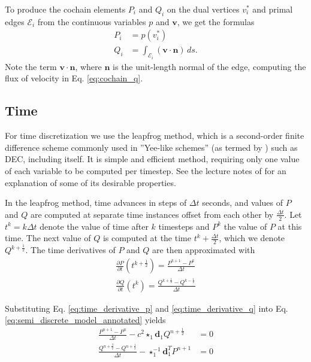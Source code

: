 \documentclass[utf8,english]{gradu3}
\begin{document}
To produce the cochain elements $P_i$ and $Q_i$
on the dual vertices $v_i^*$ and primal edges $\mathcal{E}_i$
from the continuous variables $p$ and $\mathbf{v}$,
we get the formulas
\begin{align}
  \label{eq:cochain_p}
  P_i &= p(v_i^*) \\
  \label{eq:cochain_q}
  Q_i &= \int_{\mathcal{E}_i} (\mathbf{v} \cdot \mathbf{n}) \,ds.
\end{align}
Note the term $\mathbf{v} \cdot \mathbf{n}$,
where $\mathbf{n}$ is the unit-length normal of the edge,
computing the flux of velocity in Eq. \eqref{eq:cochain_q}.


\subsection{Time}\label{sec:time_discr}

For time discretization we use the leapfrog method,
which is a second-order finite difference scheme
commonly used in ''Yee-like schemes''
(as termed by \textcite{bossavit_yee-like_1999}) such as DEC,
including \textcite{yee_numerical_1966} itself.
It is simple and efficient method,
requiring only one value of each variable to be computed per timestep.
See the lecture notes of \textcite{young_leapfrog_2014} for an explanation
of some of its desirable properties.

In the leapfrog method, time advances in steps of $\Delta t$ seconds,
and values of $P$ and $Q$ are computed at separate time instances
offset from each other by $\frac{\Delta t}{2}$.
Let $t^k = k\Delta t$ denote the value of time after $k$ timesteps
and $P^k$ the value of $P$ at this time.
The next value of $Q$ is computed at the time $t^k + \frac{\Delta t}{2}$,
which we denote $Q^{k+\frac{1}{2}}$.
The time derivatives of $P$ and $Q$ are then approximated with
\begin{eqnarray}
  \label{eq:time_derivative_p}
  \frac{\partial P}{\partial t}(t^{k+\frac{1}{2}}) = \frac{P^{k+1} - P^k}{\Delta t} \\
  \label{eq:time_derivative_q}
  \frac{\partial Q}{\partial t}(t^k) = \frac{Q^{k+\frac{1}{2}} - Q^{k-\frac{1}{2}}}{\Delta t}
\end{eqnarray}

Substituting Eq. \eqref{eq:time_derivative_p} and \eqref{eq:time_derivative_q}
into Eq. \eqref{eq:semi_discrete_model_annotated} yields
\begin{align*}
\frac{P^{n+1} - P^n}{\Delta t} - c^2 \star_1 \mathbf{d}_1 Q^{n+\frac{1}{2}} &= 0 \\
\frac{Q^{n+\frac{3}{2}} - Q^{n+\frac{1}{2}}}{\Delta t}
- \star_1^{-1} \mathbf{d}_1^T P^{n+1} &= 0 \\
\end{align*}
\end{document}

